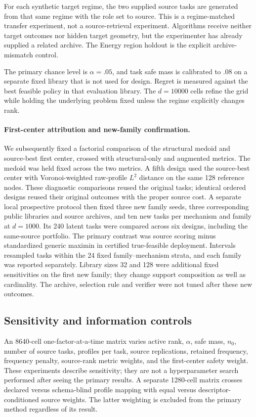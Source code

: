 For each synthetic target regime, the two supplied source tasks are generated
from that same regime with the role set to source.  This is a regime-matched
transfer experiment, not a source-retrieval experiment.  Algorithms receive
neither target outcomes nor hidden target geometry, but the experimenter has
already supplied a related archive.  The Energy region holdout is the explicit
archive-mismatch control.

The primary chance level is $\alpha=.05$, and task safe mass is calibrated to
.08 on a separate fixed library that is not used for design.  Regret is
measured against the best feasible policy in that evaluation library.  The
$d=10000$ cells refine the grid while holding the underlying problem fixed
unless the regime explicitly changes rank.

\paragraph{First-center attribution and new-family confirmation.}
We subsequently fixed a factorial comparison of the structural medoid and
source-best first center, crossed with structural-only and augmented metrics.
The medoid was held fixed across the two metrics.  A fifth design used the
source-best center with Voronoi-weighted raw-profile $L^2$ distance on the same
128 reference nodes.  These diagnostic comparisons reused the original tasks;
identical ordered designs reused their original outcomes with the proper
source cost.  A separate local prospective protocol then fixed three new
family seeds, three corresponding public libraries and source archives, and
ten new tasks per mechanism and family at $d=1000$.  Its 240 latent tasks
were compared across six designs, including the same-source portfolio.
The primary contrast was source scoring minus standardized generic maximin
in certified true-feasible deployment.  Intervals resampled tasks within the
24 fixed family--mechanism strata, and each family was reported separately.
Library sizes 32 and 128 were additional fixed sensitivities on the first new
family; they change support composition as well as cardinality.  The archive,
selection rule and verifier were not tuned after these new outcomes.

\subsection{Sensitivity and information controls}

An 8640-cell one-factor-at-a-time matrix varies active rank, $\alpha$, safe
mass, $n_0$, number of source tasks, profiles per task, source replications,
retained frequency, frequency penalty, source-rank metric weights, and the
first-center safety weight.  These experiments describe sensitivity; they are
not a hyperparameter search performed after seeing the primary results.  A
separate 1280-cell matrix crosses declared versus
schema-blind profile mapping with equal versus descriptor-conditioned source
weights.  The latter weighting is excluded from the primary method regardless
of its result.

